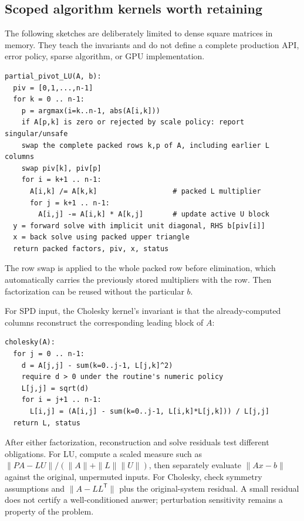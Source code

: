 \subsection{Scoped algorithm kernels worth retaining}\label{01-foundations-i-ch020-scoped-algorithm-kernels-worth-retaining}

The following sketches are deliberately limited to dense square matrices in memory. They teach the invariants and do not define a complete production API, error policy, sparse algorithm, or GPU implementation.

\begin{verbatim}
partial_pivot_LU(A, b):
  piv = [0,1,...,n-1]
  for k = 0 .. n-1:
    p = argmax(i=k..n-1, abs(A[i,k]))
    if A[p,k] is zero or rejected by scale policy: report singular/unsafe
    swap the complete packed rows k,p of A, including earlier L columns
    swap piv[k], piv[p]
    for i = k+1 .. n-1:
      A[i,k] /= A[k,k]                  # packed L multiplier
      for j = k+1 .. n-1:
        A[i,j] -= A[i,k] * A[k,j]       # update active U block
  y = forward solve with implicit unit diagonal, RHS b[piv[i]]
  x = back solve using packed upper triangle
  return packed factors, piv, x, status
\end{verbatim}

The row swap is applied to the whole packed row before elimination, which automatically carries the previously stored multipliers with the row. Then factorization can be reused without the particular \(b\).

For SPD input, the Cholesky kernel's invariant is that the already-computed columns reconstruct the corresponding leading block of \(A\):

\begin{verbatim}
cholesky(A):
  for j = 0 .. n-1:
    d = A[j,j] - sum(k=0..j-1, L[j,k]^2)
    require d > 0 under the routine's numeric policy
    L[j,j] = sqrt(d)
    for i = j+1 .. n-1:
      L[i,j] = (A[i,j] - sum(k=0..j-1, L[i,k]*L[j,k])) / L[j,j]
  return L, status
\end{verbatim}

After either factorization, reconstruction and solve residuals test different obligations. For LU, compute a scaled measure such as \(\|PA-LU\|/(\|A\|+\|L\|\|U\|)\), then separately evaluate \(\|Ax-b\|\) against the original, unpermuted inputs. For Cholesky, check symmetry assumptions and \(\|A-LL^\mathsf T\|\) plus the original-system residual. A small residual does not certify a well-conditioned answer; perturbation sensitivity remains a property of the problem.

